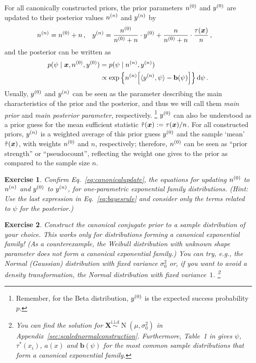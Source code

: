 \documentclass[12pt,a4paper	,twoside]{article}
\newcommand{\dd}{\,\mathrm{d}}
\newcommand{\mbf}[1]{\mathbf{#1}}
\newcommand{\bs}[1]{\boldsymbol{#1}}
\renewcommand{\vec}[1]{{\bs#1}}
\newcommand{\E}{\operatorname{E}}
\newcommand{\norm}{\operatorname{N}}
\newtheorem{myex}{Exercise}
\begin{document}
For all canonically constructed priors,
the prior parameters $n^{(0)}$ and $y^{(0)}$ are updated to their posterior values $n^{(n)}$ and $y^{(n)}$ by
\begin{align}\label{eq:canonicalupdate}
\nn &= \nz + n\,, &
\yn &= \frac{\nz}{\nz + n} \cdot \yz + \frac{n}{\nz + n} \cdot \frac{\tau(\vec{x})}{n}\,,
\end{align}
and the posterior can be written as
\begin{align}\label{eq:canonicalposterior}
p(\psi \mid \vec{x}, \nz, \yz)
 &= p(\psi \mid \nn, \yn) \nonumber\\
 &\propto \exp\Big\{ \nn \Big[ \langle \yn, \psi \rangle - \mbf{b}(\psi) \Big] \Big\} \dd\psi\,.
\end{align}
Usually, $y^{(0)}$ and $y^{(n)}$ can be seen as the parameter describing the main characteristics of the prior and the posterior,
and thus we will call them \emph{main prior} and \emph{main posterior parameter}, respectively.%
\footnote{Remember, for the Beta distribution, $y^{(0)}$ is the expected success probability $p$.}
$y^{(0)}$ can also be understood as a prior guess for the mean sufficient statistic $\ttau(\vec{x}) := \tau(\vec{x})/n$. %
For all constructed priors, $y^{(n)}$ is a weighted average of this prior guess $y^{(0)}$ and the sample `mean' $\ttau(\vec{x})$,
with weights $n^{(0)}$ and $n$, respectively;
therefore, $n^{(0)}$ can be seen as ``prior strength'' or ``pseudocount'',
reflecting the weight one gives to the prior as compared to the sample size $n$.
\begin{myex}
Confirm Eq.~\eqref{eq:canonicalupdate},
the equations for updating $n^{(0)}$ to $n^{(n)}$ and $y^{(0)}$ to $y^{(n)}$,
for one-parametric exponential family distributions.
(Hint: Use the last expression in Eq.~\eqref{eq:bayesrule}
and consider only the terms related to $\psi$ for the posterior.)
\end{myex}

\begin{myex}
Construct the canonical conjugate prior to a sample distribution of your choice.
This works only for distributions forming a canonical exponential family!
(As a counterexample, the Weibull distribution with unknown shape parameter does not form a canonical exponential family.)
You can try, e.g., the Normal (Gaussian) distribution with fixed variance $\sigma^2_0$
or, if you want to avoid a density transformation, the Normal distribution with fixed variance~$1$.%
\footnote{You can find the solution for $\vec{X} \stackrel{\text{i.i.d}}{\sim} \norm(\mu, \sigma^2_0)$
in Appendix~\ref{sec:scalednormalconstruction}.
Furthermore, Table~1 in \textcite{2005:quaeghebeurcooman} gives $\psi$, $\tau^*(x_i)$, $a(x)$ and $\mbf{b}(\psi)$
for the most common sample distributions that form a canonical exponential family.}
\end{myex}
\end{document}
